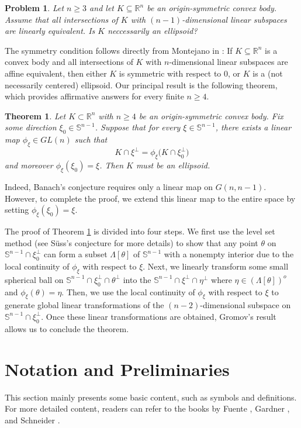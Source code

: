 \documentclass[amsfonts,reqno,11pt]{amsart}
\newtheorem{thm}{Theorem}[section]
\newtheorem{prob}{Problem}[section]
\newcommand{\Rn}{\mathbb{R}^n}
\newcommand{\sphere}{\mathbb{S}^{n-1}}
\begin{document}
\begin{prob}
    Let $n\geq 3$ and let $K\subseteq \Rn$ be an origin-symmetric convex body. Assume that all intersections of $K$ with $(n-1)$-dimensional linear subspaces are linearly equivalent. Is $K$ neccessarily an ellipsoid?
\end{prob}

The symmetry condition follows directly from Montejano in \cite{Montejano1991}: If $K\subseteq \Rn$ is a convex body and all intersections of $K$ with $n$-dimensional linear subspaces are affine equivalent, then either $K$ is symmetric with respect to $0$, or $K$ is a (not necessarily centered) ellipsoid. Our principal result is the following theorem, which provides affirmative answers for every finite $n \geq 4$.
    

\begin{thm}\label{thm 1.1}
    Let $K \subset \Rn$ with $n \ge 4$ be an origin-symmetric convex body. Fix some direction $\xi_0 \in \sphere$. Suppose that for every $\xi \in \sphere$, there exists a linear map $\phi_\xi \in GL(n)$ such that
\[
K \cap \xi^\perp = \phi_\xi\bigl(K \cap \xi_0^\perp\bigr)
\]
and moreover $\phi_\xi(\xi_0) = \xi$. Then $K$ must be an ellipsoid.
\end{thm}

Indeed, Banach's conjecture requires only a linear map on $G(n,n-1)$. However, to complete the proof, we extend this linear map to the entire space by setting $\phi_\xi(\xi_0) = \xi$.

The proof of Theorem \ref{thm 1.1} is divided into four steps. We first use the level set method (see S\"uss's conjecture \cite{LZh2024, Ryabogin2012, Zh2018} for more details) to show that any point $\theta$ on $\sphere\cap \xi_0^\perp$ can form a subset $\Lambda[\theta]$ of $\sphere$ with a nonempty interior due to the local continuity of $\phi_\xi$ with respect to $\xi$. Next, we linearly transform some small spherical ball on $\sphere\cap \xi_0^\perp\cap \theta^\perp$ into the $\sphere\cap \xi^\perp\cap \eta^\perp$ where $\eta\in (\Lambda[\theta])^o$ and $\phi_\xi(\theta)=\eta$. Then, we use the local continuity of $\phi_\xi$ with respect to $\xi$ to generate global linear transformations of the $(n-2)$-dimensional subspace on $\sphere\cap\xi_0^\perp$. Once these linear transformations are obtained, Gromov's result allows us to conclude the theorem.

\section{Notation and Preliminaries}\label{s.2}
This section mainly presents some basic content, such as symbols and definitions. For more detailed content, readers can refer to the books by  Fuente \cite{Fu}, Gardner \cite{Ga}, and Schneider \cite{Sch}.
\end{document}
